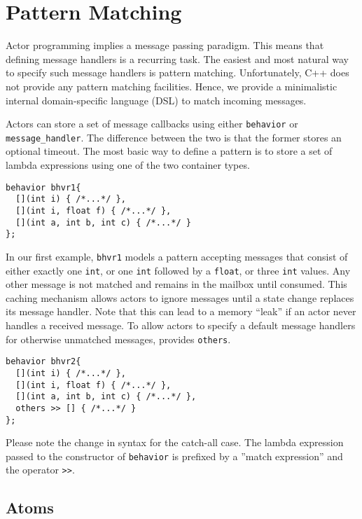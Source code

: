 \section{Pattern Matching}
\label{pattern-matching}

Actor programming implies a message passing paradigm.
This means that defining message handlers is a recurring task.
The easiest and most natural way to specify such message handlers is pattern matching.
Unfortunately, C++ does not provide any pattern matching facilities.
Hence, we provide a minimalistic internal domain-specific language (DSL) to match incoming messages.


Actors can store a set of message callbacks using either \lstinline^behavior^ or \lstinline^message_handler^.
The difference between the two is that the former stores an optional timeout.
The most basic way to define a pattern is to store a set of lambda expressions using one of the two container types.

\begin{lstlisting}
behavior bhvr1{
  [](int i) { /*...*/ },
  [](int i, float f) { /*...*/ },
  [](int a, int b, int c) { /*...*/ }
};
\end{lstlisting}

In our first example, \lstinline^bhvr1^ models a pattern accepting messages that consist of either exactly one \lstinline^int^, or one \lstinline^int^ followed by a \lstinline^float^, or three \lstinline^int^ values.
Any other message is not matched and remains in the mailbox until consumed.
This caching mechanism allows actors to ignore messages until a state change replaces its message handler.
Note that this can lead to a memory ``leak'' if an actor never handles a received message.
To allow actors to specify a default message handlers for otherwise unmatched messages, \lib provides \lstinline^others^.

\begin{lstlisting}
behavior bhvr2{
  [](int i) { /*...*/ },
  [](int i, float f) { /*...*/ },
  [](int a, int b, int c) { /*...*/ },
  others >> [] { /*...*/ }
};
\end{lstlisting}

Please note the change in syntax for the catch-all case.
The lambda expression passed to the constructor of \lstinline^behavior^ is prefixed by a ''match expression'' and the operator \lstinline^>>^.

\subsection{Atoms}
\label{atoms}

